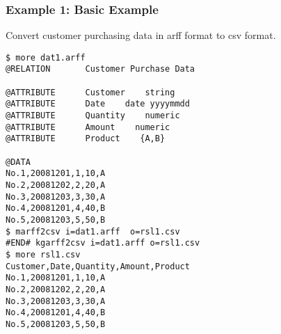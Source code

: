 \subsubsection*{Example 1: Basic Example}

Convert customer purchasing data in arff format to csv format. 


\begin{Verbatim}[baselinestretch=0.7,frame=single]
$ more dat1.arff
@RELATION       Customer Purchase Data

@ATTRIBUTE      Customer    string
@ATTRIBUTE      Date    date yyyymmdd
@ATTRIBUTE      Quantity    numeric
@ATTRIBUTE      Amount    numeric
@ATTRIBUTE      Product    {A,B}

@DATA
No.1,20081201,1,10,A
No.2,20081202,2,20,A
No.3,20081203,3,30,A
No.4,20081201,4,40,B
No.5,20081203,5,50,B
$ marff2csv i=dat1.arff  o=rsl1.csv
#END# kgarff2csv i=dat1.arff o=rsl1.csv
$ more rsl1.csv
Customer,Date,Quantity,Amount,Product
No.1,20081201,1,10,A
No.2,20081202,2,20,A
No.3,20081203,3,30,A
No.4,20081201,4,40,B
No.5,20081203,5,50,B
\end{Verbatim}
